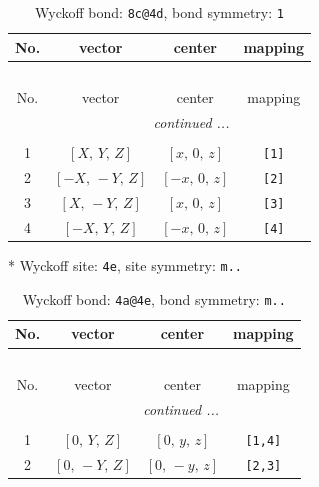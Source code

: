 \documentclass[fleqn,8pt]{jsarticle}
\begin{document}
\begin{longtable}{cccc}
\caption{Wyckoff bond: {\tt 8c@4d}, bond symmetry: {\tt 1}}
 \\
 \hline \hline
No. & vector & center & mapping \\ \hline \endfirsthead

\multicolumn{3}{l}{\tablename\ \thetable{}} \\
 \hline \hline
No. & vector & center & mapping \\ \hline \endhead

 \hline \hline
\multicolumn{3}{r}{\footnotesize\it continued ...} \\ \endfoot

 \hline \hline
\multicolumn{3}{r}{} \\ \endlastfoot

1 & $\left[ X,\, Y,\, Z \right]$ & $\left[ x,\, 0,\, z \right]$ & {\tt [1]} \\ \hline
2 & $\left[ - X,\, - Y,\, Z \right]$ & $\left[ - x,\, 0,\, z \right]$ & {\tt [2]} \\ \hline
3 & $\left[ X,\, - Y,\, Z \right]$ & $\left[ x,\, 0,\, z \right]$ & {\tt [3]} \\ \hline
4 & $\left[ - X,\, Y,\, Z \right]$ & $\left[ - x,\, 0,\, z \right]$ & {\tt [4]} \\
\end{longtable}
* Wyckoff site: {\tt 4e}, site symmetry: {\tt m..}
\renewcommand{\arraystretch}{1.2}
\begin{longtable}{cccc}
\caption{Wyckoff bond: {\tt 4a@4e}, bond symmetry: {\tt m..}}
 \\
 \hline \hline
No. & vector & center & mapping \\ \hline \endfirsthead

\multicolumn{3}{l}{\tablename\ \thetable{}} \\
 \hline \hline
No. & vector & center & mapping \\ \hline \endhead

 \hline \hline
\multicolumn{3}{r}{\footnotesize\it continued ...} \\ \endfoot

 \hline \hline
\multicolumn{3}{r}{} \\ \endlastfoot

1 & $\left[ 0,\, Y,\, Z \right]$ & $\left[ 0,\, y,\, z \right]$ & {\tt [1,4]} \\ \hline
2 & $\left[ 0,\, - Y,\, Z \right]$ & $\left[ 0,\, - y,\, z \right]$ & {\tt [2,3]} \\
\end{longtable}
\end{document}
